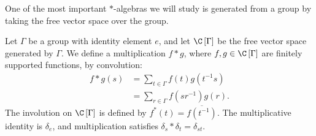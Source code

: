 One of the most important $\ast$-algebras we will study is generated from a group by taking the free vector space over the group.
\begin{definition}
  Let $\Gamma$ be a group with identity element $e$, and let $\C\left[\Gamma\right]$ be the free vector space generated by $\Gamma$. We define a multiplication $f \ast g$, where $f,g\in \C\left[\Gamma\right]$ are finitely supported functions, by convolution:
  \begin{align*}
    f\ast g(s) &= \sum_{t\in\Gamma}f(t)g\left(t^{-1}s\right)\\
               &= \sum_{r\in\Gamma}f\left(sr^{-1}\right)g\left(r\right).
  \end{align*}
  The involution on $\C\left[\Gamma\right]$ is defined by $f^{\ast}\left(t\right) = \overline{f\left(t^{-1}\right)}$. The multiplicative identity is $\delta_e$, and multiplication satisfies $\delta_s\ast \delta_t = \delta_{st}$.
\end{definition}

